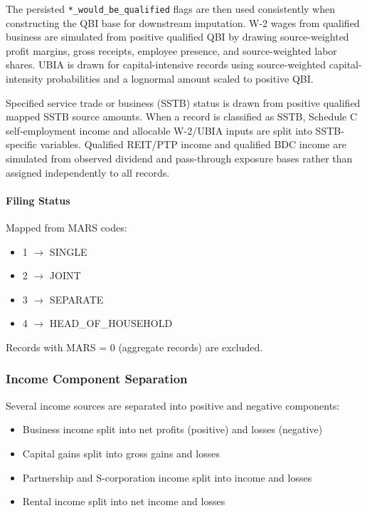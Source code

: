The persisted \texttt{*\_would\_be\_qualified} flags are then used consistently when constructing the QBI base for downstream imputation. W-2 wages from qualified business are simulated from positive qualified QBI by drawing source-weighted profit margins, gross receipts, employee presence, and source-weighted labor shares. UBIA is drawn for capital-intensive records using source-weighted capital-intensity probabilities and a lognormal amount scaled to positive QBI.

Specified service trade or business (SSTB) status is drawn from positive qualified mapped SSTB source amounts. When a record is classified as SSTB, Schedule C self-employment income and allocable W-2/UBIA inputs are split into SSTB-specific variables. Qualified REIT/PTP income and qualified BDC income are simulated from observed dividend and pass-through exposure bases rather than assigned independently to all records.

\paragraph{Filing Status}
Mapped from MARS codes:
\begin{itemize}
    \item 1 $\rightarrow$ SINGLE
    \item 2 $\rightarrow$ JOINT
    \item 3 $\rightarrow$ SEPARATE
    \item 4 $\rightarrow$ HEAD\_OF\_HOUSEHOLD
\end{itemize}

Records with MARS = 0 (aggregate records) are excluded.

\subsubsection{Income Component Separation}

Several income sources are separated into positive and negative components:

\begin{itemize}
    \item Business income split into net profits (positive) and losses (negative)
    \item Capital gains split into gross gains and losses
    \item Partnership and S-corporation income split into income and losses
    \item Rental income split into net income and losses
\end{itemize}

